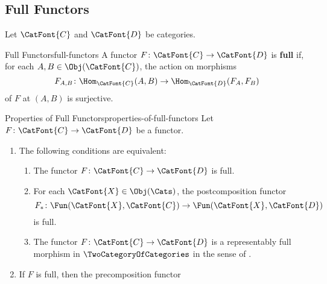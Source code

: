 \subsection{Full Functors}\label{subsection-full-functors}
Let $\CatFont{C}$ and $\CatFont{D}$ be categories.
\begin{definition}{Full Functors}{full-functors}%
    A functor $F\colon\CatFont{C}\to\CatFont{D}$ is \textbf{full} if, for each $A,B\in\Obj(\CatFont{C})$, the action on morphisms
    \[
        F_{A,B}
        \colon
        \Hom_{\CatFont{C}}(A,B)
        \to
        \Hom_{\CatFont{D}}(F_{A},F_{B})
    \]%
    of $F$ at $(A,B)$ is surjective.
\end{definition}
\begin{proposition}{Properties of Full Functors}{properties-of-full-functors}%
    Let $F\colon\CatFont{C}\to\CatFont{D}$ be a functor.
    \begin{enumerate}
        \item\label{properties-of-full-functors-interaction-with-postcomposition}The following conditions are equivalent:
            \begin{enumerate}
                \item\label{properties-of-full-functors-interaction-with-postcomposition-a}The functor $F\colon\CatFont{C}\to\CatFont{D}$ is full.
                \item\label{properties-of-full-functors-interaction-with-postcomposition-b}For each $\CatFont{X}\in\Obj(\Cats)$, the postcomposition functor
                    \[
                        F_{*}
                        \colon
                        \Fun(\CatFont{X},\CatFont{C})
                        \to
                        \Fun(\CatFont{X},\CatFont{D})
                    \]%
                    is full.
                \item\label{properties-of-full-functors-interaction-with-postcomposition-c}The functor $F\colon\CatFont{C}\to\CatFont{D}$ is a representably full morphism in $\TwoCategoryOfCategories$ in the sense of .
            \end{enumerate}
        \item\label{properties-of-full-functors-interaction-with-precomposition-1}If $F$ is full, then the precomposition functor

\end{enumerate}
\end{proposition}
